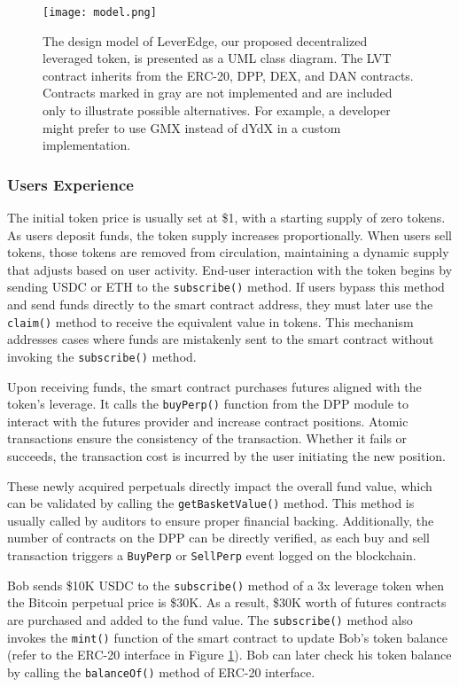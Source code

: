 \begin{figure}[p]
	\centering
	\texttt{[image: model.png]}
	\caption[LeverEdge design model]{The design model of LeverEdge, our proposed decentralized leveraged token, is presented as a UML class diagram. The LVT contract inherits from the ERC-20, DPP, DEX, and DAN contracts. Contracts marked in gray are not implemented and are included only to illustrate possible alternatives. For example, a developer might prefer to use GMX instead of dYdX in a custom implementation.}
	\label{fig:model}
\end{figure}

\subsubsection{Users Experience}
The initial token price is usually set at \$1, with a starting supply of zero tokens. As users deposit funds, the token supply increases proportionally. When users sell tokens, those tokens are removed from circulation, maintaining a dynamic supply that adjusts based on user activity. End-user interaction with the token begins by sending USDC or ETH to the \texttt{subscribe()} method. If users bypass this method and send funds directly to the smart contract address, they must later use the \texttt{claim()} method to receive the equivalent value in tokens. This mechanism addresses cases where funds are mistakenly sent to the smart contract without invoking the \texttt{subscribe()} method.

Upon receiving funds, the smart contract purchases futures aligned with the token's leverage. It calls the \texttt{buyPerp()} function from the DPP module to interact with the futures provider and increase contract positions. Atomic transactions ensure the consistency of the transaction. Whether it fails or succeeds, the transaction cost is incurred by the user initiating the new position. 

These newly acquired perpetuals directly impact the overall fund value, which can be validated by calling the \texttt{getBasketValue()} method. This method is usually called by auditors to ensure proper financial backing. Additionally, the number of contracts on the DPP can be directly verified, as each buy and sell transaction triggers a \texttt{BuyPerp} or \texttt{SellPerp} event logged on the blockchain.

\begin{example}\label{ex:experience1}
	Bob sends \$10K USDC to the \texttt{subscribe()} method of a 3x leverage token when the Bitcoin perpetual price is \$30K. As a result, \$30K worth of futures contracts are purchased and added to the fund value. The \texttt{subscribe()} method also invokes the \texttt{mint()} function of the smart contract to update Bob's token balance (refer to the ERC-20 interface in Figure \ref{fig:model}). Bob can later check his token balance by calling the \texttt{balanceOf()} method of ERC-20 interface.
\end{example}

